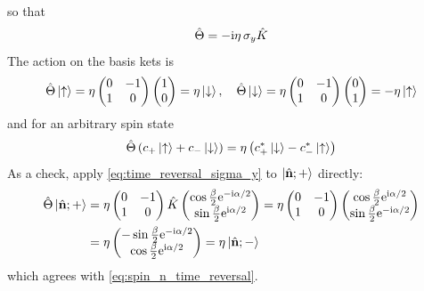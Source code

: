 so that
\begin{align}
    \hat{\Theta} = - \mathrm{i} \eta \, \sigma_y \hat{K} \label{eq:time_reversal_sigma_y}
\end{align}
The action on the basis kets is
\begin{align*}
    \hat{\Theta} \ket{\uparrow} = \eta \begin{pmatrix} 0 & -1 \\ 1 & 0 \end{pmatrix} \begin{pmatrix} 1 \\ 0 \end{pmatrix} = \eta \ket{\downarrow}, \quad
    \hat{\Theta} \ket{\downarrow} = \eta \begin{pmatrix} 0 & -1 \\ 1 & 0 \end{pmatrix} \begin{pmatrix} 0 \\ 1 \end{pmatrix} = - \eta \ket{\uparrow}
\end{align*}
and for an arbitrary spin state
\begin{align}
    \hat{\Theta} \left( c_+ \ket{\uparrow} + c_- \ket{\downarrow} \right) = \eta \left( c_+^* \ket{\downarrow} - c_-^* \ket{\uparrow} \right) \label{eq:time_reversal_spinor}
\end{align}
As a check, apply \cref{eq:time_reversal_sigma_y} to $\ket{\hat{\mathbf{n}};+}$ directly:
\begin{align*}
    \hat{\Theta} \ket{\hat{\mathbf{n}};+} &= \eta \begin{pmatrix} 0 & -1 \\ 1 & 0 \end{pmatrix} \hat{K} \begin{pmatrix} \cos\frac{\beta}{2} \mathrm{e}^{-\mathrm{i} \alpha/2} \\ \sin\frac{\beta}{2} \mathrm{e}^{\mathrm{i} \alpha/2} \end{pmatrix} = \eta \begin{pmatrix} 0 & -1 \\ 1 & 0 \end{pmatrix} \begin{pmatrix} \cos\frac{\beta}{2} \mathrm{e}^{\mathrm{i} \alpha/2} \\ \sin\frac{\beta}{2} \mathrm{e}^{-\mathrm{i} \alpha/2} \end{pmatrix} \\
    &= \eta \begin{pmatrix} -\sin\frac{\beta}{2} \mathrm{e}^{-\mathrm{i} \alpha/2} \\ \cos\frac{\beta}{2} \mathrm{e}^{\mathrm{i} \alpha/2} \end{pmatrix} = \eta \ket{\hat{\mathbf{n}};-}
\end{align*}
which agrees with \cref{eq:spin_n_time_reversal}.


